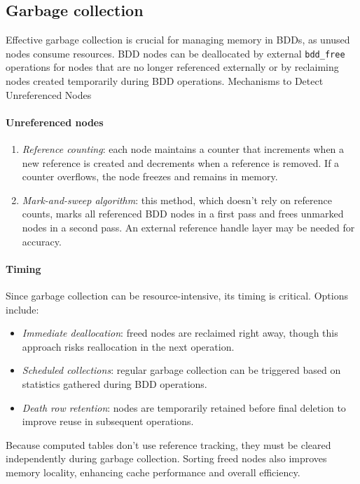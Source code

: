 \subsection{Garbage collection}
Effective garbage collection is crucial for managing memory in BDDs, as unused nodes consume resources. 
BDD nodes can be deallocated by external \texttt{bdd\_free} operations for nodes that are no longer referenced externally or by reclaiming nodes created temporarily during BDD operations.
Mechanisms to Detect Unreferenced Nodes

\paragraph*{Unreferenced nodes}
\begin{enumerate}
    \item \textit{Reference counting}: each node maintains a counter that increments when a new reference is created and decrements when a reference is removed. 
        If a counter overflows, the node freezes and remains in memory.
    \item \textit{Mark-and-sweep algorithm}: this method, which doesn't rely on reference counts, marks all referenced BDD nodes in a first pass and frees unmarked nodes in a second pass. 
        An external reference handle layer may be needed for accuracy.
\end{enumerate}

\paragraph*{Timing}
Since garbage collection can be resource-intensive, its timing is critical. 
Options include:
\begin{itemize}
    \item \textit{Immediate deallocation}: freed nodes are reclaimed right away, though this approach risks reallocation in the next operation.
    \item \textit{Scheduled collections}: regular garbage collection can be triggered based on statistics gathered during BDD operations.
    \item \textit{Death row retention}: nodes are temporarily retained before final deletion to improve reuse in subsequent operations.
\end{itemize}
Because computed tables don't use reference tracking, they must be cleared independently during garbage collection.
Sorting freed nodes also improves memory locality, enhancing cache performance and overall efficiency.